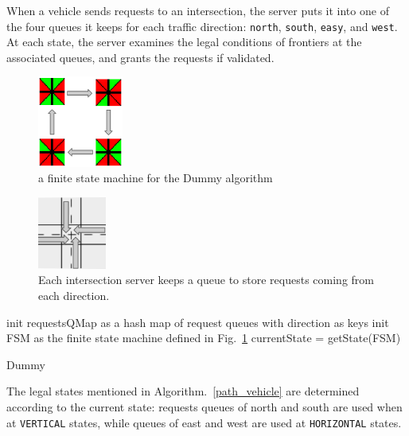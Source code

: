 \documentclass[conference]{IEEEtran}
\begin{document}
When a vehicle sends requests to an intersection, the server puts it into one of the four queues it keeps for each traffic direction: \texttt{north}, \texttt{south}, \texttt{easy}, and \texttt{west}. At each state, the server examines the legal conditions of frontiers at the associated queues, and grants the requests if validated.

\begin{figure}[h]
    \center    
    \includegraphics[width=0.25\textwidth]{images/dummy_state.png}
	\caption{a finite state machine for the Dummy algorithm}
	\label{dummy_state}
\end{figure}

\begin{figure}[h]
    \center    
    \includegraphics[width=0.2\textwidth]{images/direction.png}
	\caption{Each intersection server keeps a queue to store requests coming from each direction.}
	\label{direction}
\end{figure}


\begin{algorithm}
  init requestsQMap as a hash map of request queues with direction as keys\;
  init FSM as the finite state machine defined in Fig.~\ref{dummy_state}\;
   {
  	currentState = getState(FSM)\;
  }
  \caption{Dummy \label{dummy}}
\end{algorithm}

  The legal states mentioned in Algorithm.~\ref{path_vehicle} are determined according to the current state: requests queues of north and south are used when at \texttt{VERTICAL} states, while queues of east and west are used at \texttt{HORIZONTAL} states.
\end{document}
